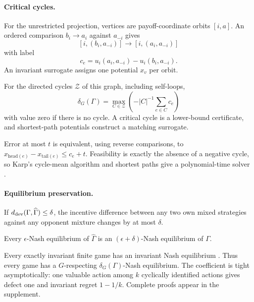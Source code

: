 \paragraph{Critical cycles.}
For the unrestricted projection, vertices are payoff-coordinate orbits $[i,a]$.  An ordered comparison $b_i\to a_i$ against $a_{-i}$ gives
\[
[i,(b_i,a_{-i})]\longrightarrow[i,(a_i,a_{-i})]
\]
with label
\[
c_e=u_i(a_i,a_{-i})-u_i(b_i,a_{-i}).
\]
An invariant surrogate assigns one potential $x_v$ per orbit.
\begin{theorem}
\label{thm:cycle}
For the directed cycles $\mathcal Z$ of this graph, including self-loops,
\begin{equation}
\boxed{
\delta_G(\Gamma)
=
\max_{C\in\mathcal Z}
\left(-|C|^{-1}\sum_{e\in C}c_e\right)
}
\label{eq:cycle-characterization}
\end{equation}
with value zero if there is no cycle.  A critical cycle is a lower-bound certificate, and shortest-path potentials construct a matching surrogate.
\end{theorem}
Error at most $t$ is equivalent, using reverse comparisons, to
$x_{\mathrm{head}(e)}-x_{\mathrm{tail}(e)}\le c_e+t$.  Feasibility is exactly the absence of a negative cycle, so Karp's cycle-mean algorithm and shortest paths give a polynomial-time solver \cite{karp1978cycle}.

\paragraph{Equilibrium preservation.}
If $d_{\mathrm{dev}}(\Gamma,\widehat\Gamma)\le\delta$, the incentive difference between any two own mixed strategies against any opponent mixture changes by at most $\delta$.
\begin{theorem}
\label{thm:transfer}
Every $\epsilon$-Nash equilibrium of $\widehat\Gamma$ is an $(\epsilon+\delta)$-Nash equilibrium of $\Gamma$.
\end{theorem}
Every exactly invariant finite game has an invariant Nash equilibrium \cite{tewolde2025game}.  Thus every game has a $G$-respecting $\delta_G(\Gamma)$-Nash equilibrium.  The coefficient is tight asymptotically: one valuable action among $k$ cyclically identified actions gives defect one and invariant regret $1-1/k$.  Complete proofs appear in the supplement.
